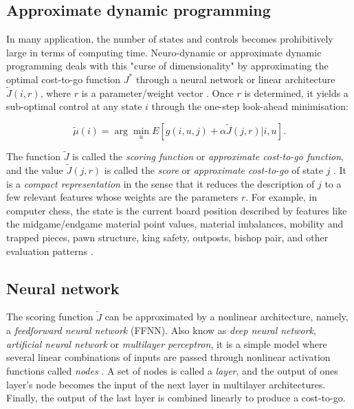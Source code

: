 \subsection{Approximate dynamic programming}

In many application, the number of states and controls becomes prohibitively large in terms of computing time. Neuro-dynamic  or approximate dynamic programming deals with this "curse of dimensionality" \citep{Bellman1962} by approximating the optimal cost-to-go function $J^*$ through a neural network or linear architecture $\tilde{J}(i,r)$, where $r$ is a parameter/weight vector \citep{Bertsekas1996, Bertsekas2011}. Once $r$ is determined, it yields a sub-optimal control at any state $i$ through the one-step look-ahead minimisation: 
 
\begin{equation}
	\tilde{\mu}(i) = \arg \min_{u} E \left[ g(i,u,j) + \alpha \tilde{J}(j,r) | i,u \right].
	\label{eq:aprox_bellman}
\end{equation}

The function $\tilde{J}$ is called the \emph{scoring function} or \emph{approximate cost-to-go function}, and the value $\tilde{J}(j,r)$ is called the \emph{score} or \emph{approximate cost-to-go} of state $j$ \citep{Bertsekas1996}. It is a \emph{compact representation} in the sense that it reduces the description of $j$ to a few relevant features whose weights are the parameters $r$. For example, in computer chess, the state is the current board position described by features like the midgame/endgame material point values, material imbalances, mobility and trapped pieces, pawn structure, king safety, outposts, bishop pair, and other evaluation patterns \citep{Bertsekas2011, Silver2017}. 


\subsection{Neural network}
\label{sec:NN}

The scoring function $\tilde{J}$ can be approximated by a nonlinear architecture, namely, a \emph{feedforward neural network} (FFNN). Also know as \emph{deep neural network}, \emph{artificial neural network} or \emph{multilayer perceptron}, it is a simple model where several linear combinations of inputs are passed through nonlinear activation functions called \emph{nodes} \citep[chapter 10]{Taddy2019}. A set of nodes is called a \emph{layer}, and the output of ones layer's node becomes the input of the next layer in multilayer architectures. Finally, the output of the last layer is combined linearly to produce a cost-to-go.

